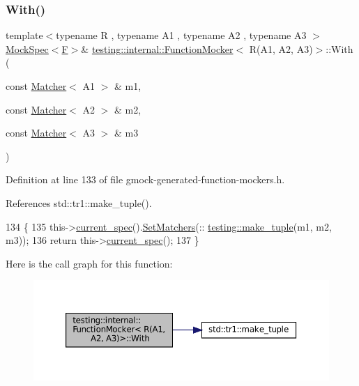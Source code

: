 \subsubsection{\texorpdfstring{With()}{With()}}
{\footnotesize\ttfamily template$<$typename R , typename A1 , typename A2 , typename A3 $>$ \\
\hyperlink{classtesting_1_1internal_1_1MockSpec}{Mock\+Spec}$<$\hyperlink{classtesting_1_1internal_1_1FunctionMocker_3_01R_07A1_00_01A2_00_01A3_08_4_a8c471830f963b8012785eb3eeca2cc9c}{F}$>$\& \hyperlink{classtesting_1_1internal_1_1FunctionMocker}{testing\+::internal\+::\+Function\+Mocker}$<$ R(A1, A2, A3)$>$\+::With (\begin{DoxyParamCaption}\item[{const \hyperlink{classtesting_1_1Matcher}{Matcher}$<$ A1 $>$ \&}]{m1,  }\item[{const \hyperlink{classtesting_1_1Matcher}{Matcher}$<$ A2 $>$ \&}]{m2,  }\item[{const \hyperlink{classtesting_1_1Matcher}{Matcher}$<$ A3 $>$ \&}]{m3 }\end{DoxyParamCaption})\hspace{0.3cm}{\ttfamily [inline]}}



Definition at line 133 of file gmock-\/generated-\/function-\/mockers.\+h.



References std\+::tr1\+::make\+\_\+tuple().


\begin{DoxyCode}
134                              \{
135     this->\hyperlink{classtesting_1_1internal_1_1FunctionMockerBase_a744318106e20b346f4f1efbf5a601644}{current\_spec}().\hyperlink{classtesting_1_1internal_1_1MockSpec_a6b4fd303136c6282b19ddb16100f02a2}{SetMatchers}(::
      \hyperlink{namespacestd_1_1tr1_af7e12a0f5b5791b5b7c49a5a17b85359}{testing::make\_tuple}(m1, m2, m3));
136     \textcolor{keywordflow}{return} this->\hyperlink{classtesting_1_1internal_1_1FunctionMockerBase_a744318106e20b346f4f1efbf5a601644}{current\_spec}();
137   \}
\end{DoxyCode}
Here is the call graph for this function\+:
\nopagebreak
\begin{figure}[H]
\begin{center}
\leavevmode
\includegraphics[width=350pt]{classtesting_1_1internal_1_1FunctionMocker_3_01R_07A1_00_01A2_00_01A3_08_4_a349af66650c6d0401dd1c0081773c25a_cgraph}
\end{center}
\end{figure}


